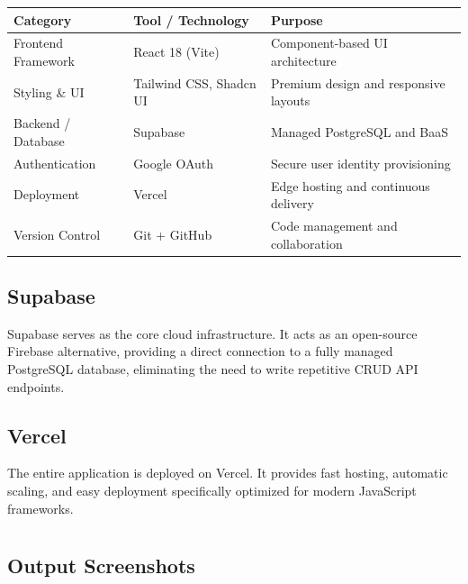 \documentclass[12pt,a4paper]{report}     %
\begin{document}
\begin{center}
\begin{tabular}{|l|l|l|}
\hline
\textbf{Category} & \textbf{Tool / Technology} & \textbf{Purpose} \\
\hline
Frontend Framework & React 18 (Vite) & Component-based UI architecture \\
\hline
Styling \& UI & Tailwind CSS, Shadcn UI & Premium design and responsive layouts \\
\hline
Backend / Database & Supabase & Managed PostgreSQL and BaaS \\
\hline
Authentication & Google OAuth & Secure user identity provisioning \\
\hline
Deployment & Vercel & Edge hosting and continuous delivery \\
\hline
Version Control & Git + GitHub & Code management and collaboration \\
\hline
\end{tabular}
\end{center}

\vspace{0.3cm}


\section{Supabase}

Supabase serves as the core cloud infrastructure. It acts as an open-source Firebase alternative, providing a direct connection to a fully managed PostgreSQL database, eliminating the need to write repetitive CRUD API endpoints.

\vspace{0.3cm}

\section{Vercel}

The entire application is deployed on Vercel. It provides fast hosting, automatic scaling, and easy deployment specifically optimized for modern JavaScript frameworks.

\chapter{}

\section{Output Screenshots}
\end{document}
